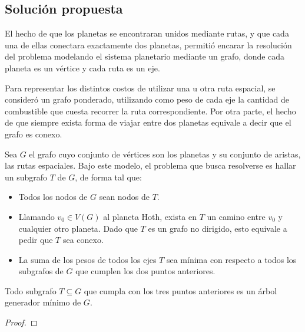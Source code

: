     \subsection{Solución propuesta}

    El hecho de que los planetas se encontraran unidos mediante rutas, y que
    cada una de ellas conectara exactamente dos planetas, permitió encarar la
    resolución del problema modelando el sistema planetario mediante un
    grafo, donde cada planeta es un vértice y cada ruta es un eje.

    Para representar los distintos costos de utilizar una u otra ruta
    espacial, se consideró un grafo ponderado, utilizando como peso de cada
    eje la cantidad de combustible que cuesta recorrer la ruta
    correspondiente. Por otra parte, el hecho de que siempre exista forma de
    viajar entre dos planetas equivale a decir que el grafo es conexo.

    Sea $G$ el grafo cuyo conjunto de vértices son los planetas y su conjunto
    de aristas, las rutas espaciales. Bajo este modelo, el problema que busca
    resolverse es hallar un subgrafo $T$ de $G$, de forma tal que:
    \begin{itemize}
        \item Todos los nodos de $G$ sean nodos de $T$.
        \item Llamando $v_0 \in V(G)$ al planeta Hoth, exista en $T$ un camino
        entre $v_0$ y cualquier otro planeta. Dado que $T$ es un grafo no
        dirigido, esto equivale a pedir que $T$ sea conexo.
        \item La suma de los pesos de todos los ejes $T$ sea mínima con
        respecto a todos los subgrafos de $G$ que cumplen los dos puntos
        anteriores.
    \end{itemize}


    \begin{lema}
    Todo subgrafo $T \subseteq G$ que cumpla con los tres puntos anteriores
    es un árbol generador mínimo de $G$.
    \end{lema}
    \begin{proof}

    \end{proof}

